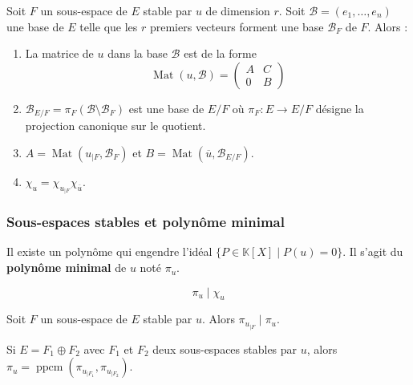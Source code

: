 
  \begin{proposition}
    Soit $F$ un sous-espace de $E$ stable par $u$ de dimension $r$. Soit $\mathcal{B} = (e_1, \dots, e_n)$ une base de $E$ telle que les $r$ premiers vecteurs forment une base $\mathcal{B}_F$ de $F$. Alors :
    \begin{enumerate}[label=(\roman*)]
      \item La matrice de $u$ dans la base $\mathcal{B}$ est de la forme
      \[ \operatorname{Mat}(u, \mathcal{B}) = \begin{pmatrix} A & C \\ 0 & B \end{pmatrix} \]
      \item $\mathcal{B}_{E/F} = \pi_F(\mathcal{B} \setminus \mathcal{B}_F)$ est une base de $E/F$ où $\pi_F : E \rightarrow E/F$ désigne la projection canonique sur le quotient.
      \item $A = \operatorname{Mat}(u_{|F}, \mathcal{B}_F)$ et $B = \operatorname{Mat}(\overline{u}, \mathcal{B}_{E/F})$.
      \item $\chi_u = \chi_{u_{|F}} \chi_{\overline{u}}$.
    \end{enumerate}
  \end{proposition}

  \subsubsection{Sous-espaces stables et polynôme minimal}


  \begin{proposition}
    Il existe un polynôme qui engendre l'idéal $\{ P \in \mathbb{K}[X] \mid P(u) = 0 \}$. Il s'agit du \textbf{polynôme minimal} de $u$ noté $\pi_u$.
  \end{proposition}

  \begin{theorem}
    \[ \pi_u \mid \chi_u \]
  \end{theorem}

  \begin{proposition}
    Soit $F$ un sous-espace de $E$ stable par $u$. Alors $\pi_{u_{|F}} \mid \pi_u$.
  \end{proposition}

  \begin{proposition}
    Si $E = F_1 \oplus F_2$ avec $F_1$ et $F_2$ deux sous-espaces stables par $u$, alors $\pi_u = \operatorname{ppcm}(\pi_{u_{|F_1}}, \pi_{u_{|F_2}})$.
  \end{proposition}

